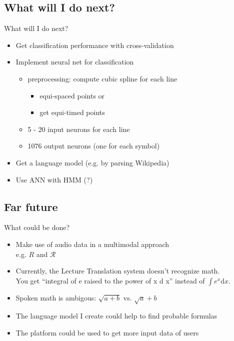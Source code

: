 \subsection{What will I do next?}
\begin{frame}{What will I do next?}
    \begin{itemize}
        \item Get classification performance with cross-validation
        \item Implement neural net for classification
        \begin{itemize}
            \item preprocessing: compute cubic spline for each line
            \begin{itemize}
                \item equi-spaced points or
                \item get equi-timed points
            \end{itemize}
            \item 5 - 20 input neurons for each line
            \item 1076 output neurons (one for each symbol)
        \end{itemize}
        \item Get a language model (e.g. by parsing Wikipedia)
        \item Use ANN with HMM (?)
    \end{itemize}
\end{frame}

\subsection{Far future}
\begin{frame}{What could be done?}
    \begin{itemize}
        \item Make use of audio data in a multimodal approach\\
              e.g. $R$ and $\mathcal{R}$
        \item Currently, the Lecture Translation system doesn't recognize math.\\
              You get \enquote{integral of e raised to the power of x d x} instead
              of $\int e^x \mathrm{d} x$.
        \item Spoken math is ambigous: $\sqrt{a+b}$ vs. $\sqrt{a} + b$
        \item The language model I create could help to find probable formulas
        \item The platform could be used to get more input data of users
    \end{itemize}
\end{frame}